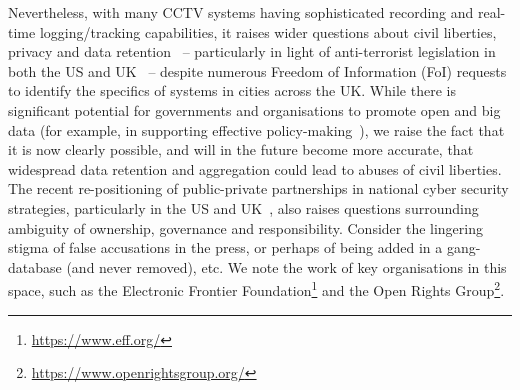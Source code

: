 \documentclass[conference]{IEEEtran}
\begin{document}
Nevertheless, with many CCTV systems having sophisticated recording
and real-time logging/tracking capabilities, it raises wider questions
about civil liberties, privacy and data retention~\cite{goold:2002} --
particularly in light of anti-terrorist legislation in both the US and
UK~\cite{bowden:2002} -- despite numerous Freedom of Information (FoI)
requests to identify the specifics of systems in cities across the
UK. While there is significant potential for governments and
organisations to promote open and big data (for example, in supporting
effective policy-making~\cite{nesta:2015}), we raise the fact that it
is now clearly possible, and will in the future become more accurate,
that widespread data retention and aggregation could lead to abuses of
civil liberties. The recent re-positioning of public-private
partnerships in national cyber security strategies, particularly in
the US and UK~\cite{carr+crick:2015}, also raises questions
surrounding ambiguity of ownership, governance and
responsibility. Consider the lingering stigma of false accusations in
the press, or perhaps of being added in a gang-database (and never
removed), etc. We note the work of key organisations in this space,
such as the Electronic Frontier
Foundation\footnote{\url{https://www.eff.org/}} and the Open Rights
Group\footnote{\url{https://www.openrightsgroup.org/}}.






\end{document}
